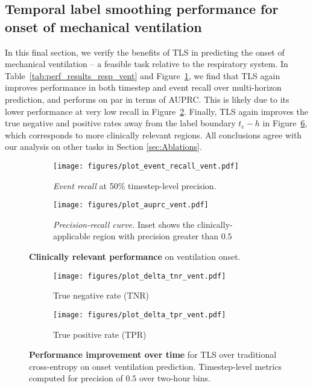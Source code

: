 \documentclass[nohyperref]{article}
\begin{document}
\subsection{Temporal label smoothing performance for onset of mechanical ventilation}

In this final section, we verify the benefits of TLS in predicting the onset of mechanical ventilation -- a feasible task relative to the respiratory system. In Table~\ref{tab:perf_results_resp_vent}  and Figure~\ref{fig:based_vent}, we find that TLS again improves performance in both timestep and event recall over multi-horizon prediction, and performs on par in terms of AUPRC. This is likely due to its lower performance at very low recall in Figure~\ref{fig:PR_curve_vent}. Finally, TLS again improves the true negative and positive rates away from the label boundary $t_e-h$ in Figure~\ref{fig:plot_delta_vent}, which corresponds to more clinically relevant regions. All conclusions agree with our analysis on other tasks in Section \ref{sec:Ablations}.

\begin{figure}[h]
\centering
\begin{subfigure}[b]{0.49\textwidth}
 \centering
  \texttt{[image: figures/plot\_event\_recall\_vent.pdf]}
  \caption{\textit{Event recall} at 50\% timestep-level precision.} \label{fig:based_vent}
\end{subfigure}
\begin{subfigure}[b]{0.49\textwidth}
  \centering
  \texttt{[image: figures/plot\_auprc\_vent.pdf]}
  \caption{\textit{Precision-recall curve.} Inset shows the clinically-applicable region with precision greater than $0.5$}
  \label{fig:PR_curve_vent}
\end{subfigure}
\caption{\textbf{Clinically relevant performance} on ventilation onset.}
\label{fig:clinical_performance_vent}
\end{figure}

\begin{figure}[h]
\begin{subfigure}[b]{0.47\textwidth}
  \centering
  \texttt{[image: figures/plot\_delta\_tnr\_vent.pdf]}\vspace{-0.5em}\caption{True negative rate (TNR)}\vspace{-0.25em}
  \label{fig:delta_tnr_vent}
\end{subfigure} \hfill
\begin{subfigure}[b]{0.47\textwidth}
 \centering
  \texttt{[image: figures/plot\_delta\_tpr\_vent.pdf]}\vspace{-0.5em}\caption{True positive rate (TPR)}\vspace{-0.25em}
  \label{fig:delta_tpr_vent}
\end{subfigure}
\caption{\textbf{Performance improvement over time} for TLS over traditional cross-entropy on onset ventilation prediction. Timestep-level metrics computed for precision of $0.5$ over two-hour bins.}
\vspace{-1em}
\label{fig:plot_delta_vent}
\end{figure}
\end{document}
